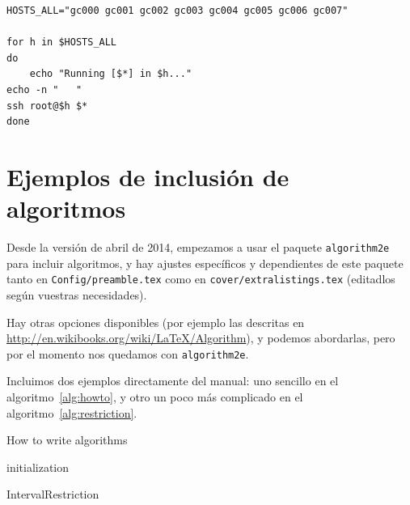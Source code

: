 \documentclass[spanish,openright]{book}
\providecommand{\DontPrintSemicolon}{\dontprintsemicolon}
\begin{document}
\begin{appendices}
\begin{lstlisting}[style=BashInputStyle, numbers=none]
HOSTS_ALL="gc000 gc001 gc002 gc003 gc004 gc005 gc006 gc007"

for h in $HOSTS_ALL
do
	echo "Running [$*] in $h..."
echo -n "   "
ssh root@$h $*
done
\end{lstlisting}


\section{Ejemplos de inclusión de algoritmos}
\label{sec:algoritmos}

Desde la versión de abril de 2014, empezamos a usar el paquete
\texttt{algorithm2e} para incluir algoritmos, y hay ajustes específicos
y dependientes de este paquete tanto en \texttt{Config/preamble.tex}
como en \texttt{cover/extralistings.tex} (editadlos según vuestras
necesidades).

Hay otras opciones disponibles (por ejemplo las descritas en
\url{http://en.wikibooks.org/wiki/LaTeX/Algorithm}), y podemos
abordarlas, pero por el momento nos quedamos con \texttt{algorithm2e}.

Incluimos dos ejemplos directamente del manual: uno sencillo en el
algoritmo~\ref{alg:howto}, y otro un poco más complicado en el
algoritmo~\ref{alg:restriction}.

\begin{algorithm}[H]
\caption{How to write algorithms}
\label{alg:howto}
initialization\;
\end{algorithm}


\begin{algorithm}
\caption{IntervalRestriction\label{IR}}
\label{alg:restriction}
\DontPrintSemicolon
{}
\end{algorithm}







\end{appendices}
\end{document}
